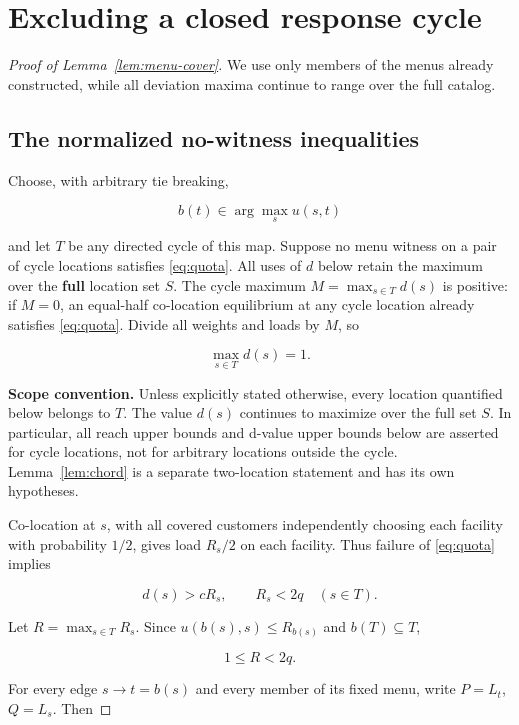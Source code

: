 \documentclass[11pt]{amsart}
\numberwithin{equation}{section}
\theoremstyle{definition}
\begin{document}
\section{Excluding a closed response cycle}\label{app:cycle}
\begin{proof}[Proof of Lemma~\ref{lem:menu-cover}]
We use only members of the menus already constructed, while all deviation maxima continue to range over the full catalog.
\subsection{The normalized no-witness inequalities}
Choose, with arbitrary tie breaking,

\[
b(t)\in\arg\max_s u(s,t)
\]

and let \(T\) be any directed cycle of this map. Suppose no menu witness on a pair of cycle locations satisfies \eqref{eq:quota}. All uses of \(d\) below retain the maximum over the \textbf{full} location set \(S\). The cycle maximum \(M=\max_{s\in T}d(s)\) is positive: if \(M=0\), an equal-half co-location equilibrium at any cycle location already satisfies \eqref{eq:quota}. Divide all weights and loads by \(M\), so

\[
\max_{s\in T}d(s)=1.
\]

\textbf{Scope convention.} Unless explicitly stated otherwise, every location quantified below belongs to \(T\). The value \(d(s)\) continues to maximize over the full set \(S\). In particular, all reach upper bounds and d-value upper bounds below are asserted for cycle locations, not for arbitrary locations outside the cycle. Lemma~\ref{lem:chord} is a separate two-location statement and has its own hypotheses.

Co-location at \(s\), with all covered customers independently choosing each facility with probability \(1/2\), gives load \(R_s/2\) on each facility. Thus failure of \eqref{eq:quota} implies

\begin{equation}
d(s)>cR_s,\qquad R_s<2q\quad(s\in T). \label{eq:old-2-2}
\end{equation}

Let \(R=\max_{s\in T}R_s\). Since \(u(b(s),s)\le R_{b(s)}\) and \(b(T)\subseteq T\),

\begin{equation}
1\le R<2q. \label{eq:old-2-3}
\end{equation}

For every edge \(s\to t=b(s)\) and every member of its fixed menu, write \(P=L_t\), \(Q=L_s\). Then


\end{proof}
\end{document}
